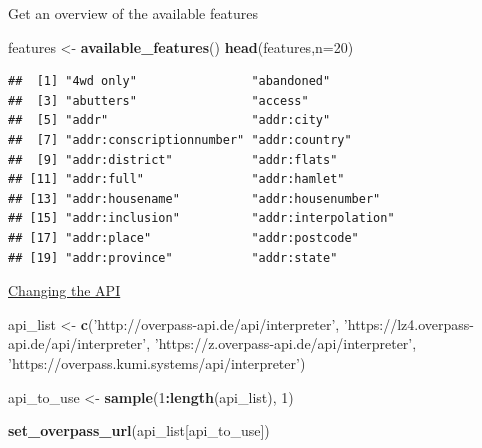 \documentclass[ignorenonframetext,]{beamer}
\newenvironment{Shaded}{\begin{snugshade}}{\end{snugshade}}
\newcommand{\KeywordTok}[1]{\textcolor[rgb]{0.13,0.29,0.53}{\textbf{#1}}}
\newcommand{\DataTypeTok}[1]{\textcolor[rgb]{0.13,0.29,0.53}{#1}}
\newcommand{\DecValTok}[1]{\textcolor[rgb]{0.00,0.00,0.81}{#1}}
\newcommand{\StringTok}[1]{\textcolor[rgb]{0.31,0.60,0.02}{#1}}
\newcommand{\OperatorTok}[1]{\textcolor[rgb]{0.81,0.36,0.00}{\textbf{#1}}}
\newcommand{\NormalTok}[1]{#1}
\begin{document}
\begin{frame}[fragile]{Get an overview of the available features}

\begin{Shaded}
\begin{Highlighting}[]
\NormalTok{features <-}\StringTok{ }\KeywordTok{available_features}\NormalTok{()}
\KeywordTok{head}\NormalTok{(features,}\DataTypeTok{n=}\DecValTok{20}\NormalTok{)}
\end{Highlighting}
\end{Shaded}

\begin{verbatim}
##  [1] "4wd only"                "abandoned"              
##  [3] "abutters"                "access"                 
##  [5] "addr"                    "addr:city"              
##  [7] "addr:conscriptionnumber" "addr:country"           
##  [9] "addr:district"           "addr:flats"             
## [11] "addr:full"               "addr:hamlet"            
## [13] "addr:housename"          "addr:housenumber"       
## [15] "addr:inclusion"          "addr:interpolation"     
## [17] "addr:place"              "addr:postcode"          
## [19] "addr:province"           "addr:state"
\end{verbatim}

\end{frame}

\begin{frame}[fragile]{\href{https://github.com/ropensci/osmdata/issues/126}{Changing
the API}}

\begin{Shaded}
\begin{Highlighting}[]
\NormalTok{api_list <-}\StringTok{ }\KeywordTok{c}\NormalTok{(}\StringTok{'http://overpass-api.de/api/interpreter'}\NormalTok{,}
              \StringTok{'https://lz4.overpass-api.de/api/interpreter'}\NormalTok{,}
              \StringTok{'https://z.overpass-api.de/api/interpreter'}\NormalTok{,}
              \StringTok{'https://overpass.kumi.systems/api/interpreter'}\NormalTok{)}

\NormalTok{api_to_use <-}\StringTok{ }\KeywordTok{sample}\NormalTok{(}\DecValTok{1}\OperatorTok{:}\KeywordTok{length}\NormalTok{(api_list), }\DecValTok{1}\NormalTok{)}

\KeywordTok{set_overpass_url}\NormalTok{(api_list[api_to_use]) }
\end{Highlighting}
\end{Shaded}

\end{frame}
\end{document}
